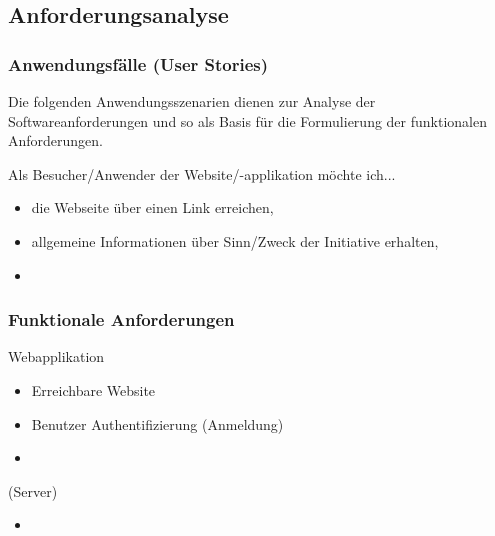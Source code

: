 \subsection{Anforderungsanalyse}


\subsubsection{Anwendungsfälle (User Stories)}

Die folgenden Anwendungsszenarien dienen zur Analyse der Softwareanforderungen und so als Basis für die Formulierung der funktionalen Anforderungen. 

Als Besucher/Anwender der Website/-applikation möchte ich...

\begin{itemize}

\item die Webseite über einen Link erreichen,
\item allgemeine Informationen über Sinn/Zweck der Initiative erhalten,
\item 

\end{itemize}







\subsubsection{Funktionale Anforderungen}

Webapplikation 




\begin{itemize}

\item Erreichbare Website
\item Benutzer Authentifizierung (Anmeldung)
\item 

\end{itemize}



 (Server)

\begin{itemize}

\item

\end{itemize}




